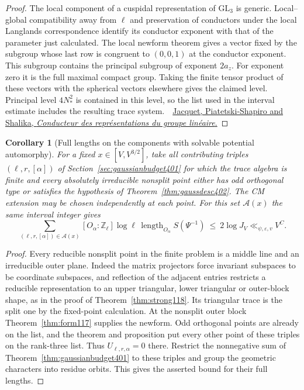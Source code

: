 \documentclass[a4paper,11pt]{article}
\newtheorem{corollary}[proposition]{Corollary}
\theoremstyle{definition}
\theoremstyle{remark}
\newcommand{\ZZ}{\mathbb Z}\newcommand{\ord}{\operatorname{ord}}
\numberwithin{equation}{section}
\begin{document}
\begin{proof}
The local component of a cuspidal representation of
\(\mathrm{GL}_3\) is generic. Local--global compatibility away
from \(\ell\) and preservation of conductors under the local
Langlands correspondence identify its conductor exponent with
that of the parameter just calculated. The local newform
theorem gives a vector fixed by the subgroup whose last row
is congruent to \((0,0,1)\) at the conductor exponent. This
subgroup contains the principal subgroup of exponent \(2a_z\).
For exponent zero it is the full maximal compact group. Taking
the finite tensor product of these vectors with the spherical
vectors elsewhere gives the claimed level. Principal level
\(4N_*^2\) is contained in this level, so the list used in
the interval estimate includes the resulting trace system.
\,\cite{VIII-VI-V-shin}\ \href{https://lesesvre.perso.math.cnrs.fr/newforms-references/jpss.pdf}{Jacquet, Piatetski-Shapiro and Shalika, \emph{Conducteur des repr\'esentations du groupe lin\'eaire}.}
\end{proof}

\begin{corollary}[Full lengths on the components with solvable potential automorphy]\leavevmode
\label{cor:gausssum402}
For a fixed \(x\in[V,V^{3/2}]\), take all contributing triples
\((\ell,r,[\alpha])\) of Section~\ref{sec:gaussianbudget401}
for which the trace algebra is finite and every absolutely
irreducible nonsplit point either has odd orthogonal type or
satisfies the hypothesis of Theorem~\ref{thm:gaussdesc402}.
The CM extension may be chosen independently at each point.
For this set \(\mathcal A(x)\) the same interval integer gives
\[
 \sum_{(\ell,r,[\alpha])\in\mathcal A(x)}
  [O_\alpha:\ZZ_\ell]\log\ell\,
             \operatorname{length}_{O_\alpha}S(\Psi^{-1})
             \ \le\ 2\log J_V\ll_{\psi,\varepsilon,v}V^C .
\]
\end{corollary}
\begin{proof}
Every reducible nonsplit point in the finite problem is a
middle line and an irreducible outer plane. Indeed the matrix
projectors force invariant subspaces to be coordinate subspaces,
and reflection of the adjacent entries restricts a reducible
representation to an upper triangular, lower triangular or
outer-block shape, as in the proof of
Theorem~\ref{thm:strong118}. Its triangular trace is the split
one by the fixed-point calculation. At the nonsplit outer block
Theorem~\ref{thm:form117} supplies the newform. Odd orthogonal
points are already on the list, and the theorem and proposition
put every other point of these triples on the rank-three list.
Thus \(U_{\ell,r,\alpha}=0\) there. Restrict the nonnegative sum
of Theorem~\ref{thm:gaussianbudget401} to these triples and
group the geometric characters into residue orbits. This gives
the asserted bound for their full lengths.
\end{proof}
\end{document}
